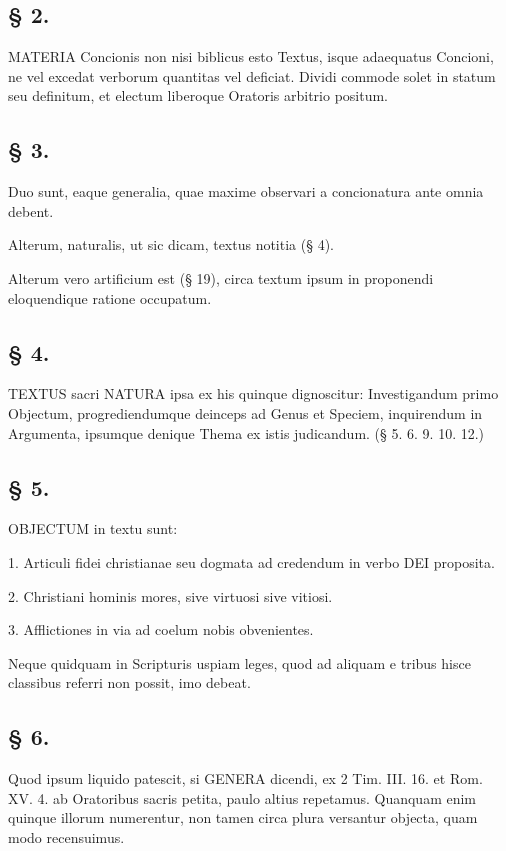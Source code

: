 \subsection*{§ 2.}

MATERIA Concionis non nisi biblicus esto Textus, isque adaequatus Concioni, ne vel excedat verborum quantitas vel deficiat. Dividi commode solet in statum seu definitum, et electum liberoque Oratoris arbitrio positum.

\subsection*{§ 3.}

Duo sunt, eaque generalia, quae maxime observari a concionatura ante omnia debent.

Alterum, naturalis, ut sic dicam, textus notitia (§ 4).

Alterum vero artificium est (§ 19), circa textum ipsum in proponendi eloquendique ratione occupatum.

\subsection*{§ 4.}

TEXTUS sacri NATURA ipsa ex his quinque dignoscitur: Investigandum primo Objectum, progrediendumque deinceps ad Genus et Speciem, inquirendum in Argumenta, ipsumque denique Thema ex istis judicandum. (§ 5. 6. 9. 10. 12.)

\subsection*{§ 5.}

OBJECTUM in textu sunt:

1. Articuli fidei christianae seu dogmata ad credendum in verbo DEI proposita.

2. Christiani hominis mores, sive virtuosi sive vitiosi.

3. Afflictiones in via ad coelum nobis obvenientes.

Neque quidquam in Scripturis uspiam leges, quod ad aliquam e tribus hisce classibus referri non possit, imo debeat.

\subsection*{§ 6.}

Quod ipsum liquido patescit, si GENERA dicendi, ex 2 Tim. III. 16. et Rom. XV. 4. ab Oratoribus sacris petita, paulo altius repetamus. Quanquam enim quinque illorum numerentur, non tamen circa plura versantur objecta, quam modo recensuimus.

